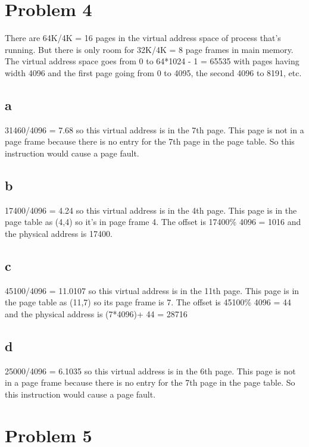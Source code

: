\documentclass[11pt]{article} %
\begin{document}
\section*{Problem 4}
There are 64K/4K = 16 pages in the virtual address space of process that's running. But there is only room for 32K/4K = 8 page frames in main memory. The virtual address space goes from 0 to 64*1024 - 1 = 65535 with pages having width 4096 and the first page going from 0 to 4095, the second 4096 to 8191, etc. 

\subsection*{a}

31460/4096 = 7.68 so this virtual address is in the 7th page. This page is not in a page frame because there is no entry for the 7th page in the page table. So this instruction would cause a page fault.

\subsection*{b}

17400/4096 = 4.24 so this virtual address is in the 4th page. This page is in the page table as (4,4) so it's in page frame 4. The offset is 17400\% 4096 = 1016 and the physical address is 17400.

\subsection*{c}

45100/4096 = 11.0107 so this virtual address is in the 11th page. This page is in the page table as (11,7) so its page frame is 7. The offset is 45100\% 4096 = 44 and the physical address is (7*4096)+ 44 = 28716

\subsection*{d}

25000/4096 = 6.1035 so this virtual address is in the 6th page. This page is not in a page frame because there is no entry for the 7th page in the page table. So this instruction would cause a page fault.

\section*{Problem 5}

\noindent {}
\end{document}
